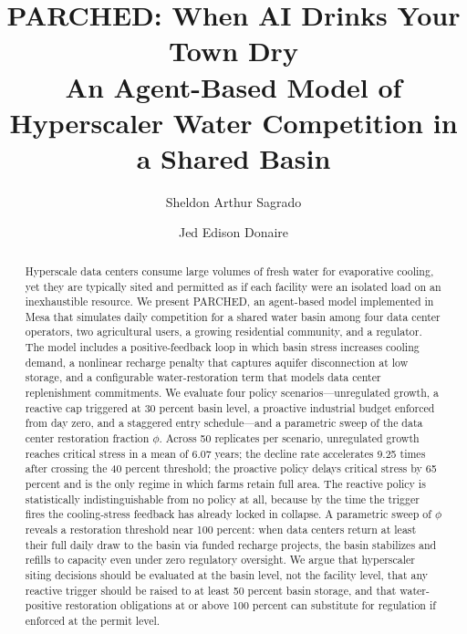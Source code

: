 \documentclass[sigconf,nonacm]{acmart}
\begin{document}
\title[PARCHED: AI Drinks Your Town Dry]{PARCHED: When AI Drinks Your Town Dry\\An Agent-Based Model of Hyperscaler Water Competition in a Shared Basin}

\author{Sheldon Arthur Sagrado}

\author{Jed Edison Donaire}
\authornotemark[1]

\renewcommand{\shortauthors}{Sagrado and Donaire}

\begin{abstract}
Hyperscale data centers consume large volumes of fresh water for evaporative cooling, yet they are typically sited and permitted as if each facility were an isolated load on an inexhaustible resource. We present PARCHED, an agent-based model implemented in Mesa that simulates daily competition for a shared water basin among four data center operators, two agricultural users, a growing residential community, and a regulator. The model includes a positive-feedback loop in which basin stress increases cooling demand, a nonlinear recharge penalty that captures aquifer disconnection at low storage, and a configurable water-restoration term that models data center replenishment commitments. We evaluate four policy scenarios---unregulated growth, a reactive cap triggered at 30 percent basin level, a proactive industrial budget enforced from day zero, and a staggered entry schedule---and a parametric sweep of the data center restoration fraction $\phi$. Across 50 replicates per scenario, unregulated growth reaches critical stress in a mean of 6.07 years; the decline rate accelerates 9.25 times after crossing the 40 percent threshold; the proactive policy delays critical stress by 65 percent and is the only regime in which farms retain full area. The reactive policy is statistically indistinguishable from no policy at all, because by the time the trigger fires the cooling-stress feedback has already locked in collapse. A parametric sweep of $\phi$ reveals a restoration threshold near 100 percent: when data centers return at least their full daily draw to the basin via funded recharge projects, the basin stabilizes and refills to capacity even under zero regulatory oversight. We argue that hyperscaler siting decisions should be evaluated at the basin level, not the facility level, that any reactive trigger should be raised to at least 50 percent basin storage, and that water-positive restoration obligations at or above 100 percent can substitute for regulation if enforced at the permit level.
\end{abstract}
\end{document}
